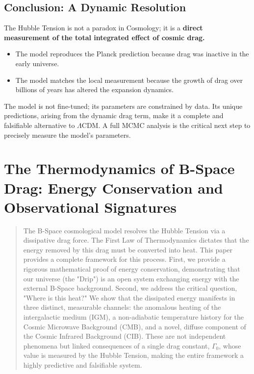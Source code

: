 \documentclass{BSpacePaper} %
\begin{document}
\begin{appendices}
\subsection{Conclusion: A Dynamic Resolution}
The Hubble Tension is not a paradox in \bspace{} Cosmology; it is a \textbf{direct measurement of the total integrated effect of cosmic drag.}
\begin{itemize}
    \item The model reproduces the Planck prediction because drag was inactive in the early universe.
    \item The model matches the local measurement because the growth of drag over billions of years has altered the expansion dynamics.
\end{itemize}
The model is not fine-tuned; its parameters are constrained by data. Its unique predictions, arising from the dynamic drag term, make it a complete and falsifiable alternative to \(\Lambda\)CDM. A full MCMC analysis is the critical next step to precisely measure the model's parameters.

\clearpage


\section{The Thermodynamics of B-Space Drag: Energy Conservation and Observational Signatures}
\label{app:thermo}
\setcounter{equation}{0}
\setcounter{table}{0}
\setcounter{figure}{0}

\begin{abstract}
\noindent
The B-Space cosmological model resolves the Hubble Tension via a dissipative drag force. The First Law of Thermodynamics dictates that the energy removed by this drag must be converted into heat. This paper provides a complete framework for this process. First, we provide a rigorous mathematical proof of energy conservation, demonstrating that our universe (the "Drip") is an open system exchanging energy with the external B-Space background. Second, we address the critical question, "Where is this heat?" We show that the dissipated energy manifests in three distinct, measurable channels: the anomalous heating of the intergalactic medium (IGM), a non-adiabatic temperature history for the Cosmic Microwave Background (CMB), and a novel, diffuse component of the Cosmic Infrared Background (CIB). These are not independent phenomena but linked consequences of a single drag constant, $\Gamma_0$, whose value is measured by the Hubble Tension, making the entire framework a highly predictive and falsifiable system.
\end{abstract}


\end{appendices}
\end{document}
